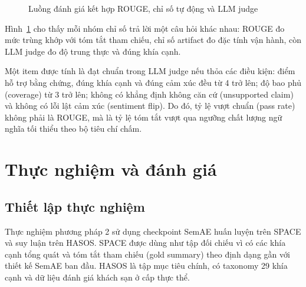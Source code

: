 \documentclass[12pt,a4paper]{report}
\begin{document}
\begin{figure}[tbp]
\centering
{}
\caption{Luồng đánh giá kết hợp ROUGE, chỉ số tự động và LLM judge}
\label{fig:evaluation-flow}
\end{figure}

Hình~\ref{fig:evaluation-flow} cho thấy mỗi nhóm chỉ số trả lời một câu hỏi khác nhau: ROUGE đo mức trùng khớp với tóm tắt tham chiếu, chỉ số artifact đo đặc tính vận hành, còn LLM judge đo độ trung thực và đúng khía cạnh.

Một item được tính là đạt chuẩn trong LLM judge nếu thỏa các điều kiện: điểm hỗ trợ bằng chứng, đúng khía cạnh và đúng cảm xúc đều từ 4 trở lên; độ bao phủ (coverage) từ 3 trở lên; không có khẳng định không căn cứ (unsupported claim) và không có lỗi lật cảm xúc (sentiment flip). Do đó, tỷ lệ vượt chuẩn (pass rate) không phải là ROUGE, mà là tỷ lệ tóm tắt vượt qua ngưỡng chất lượng ngữ nghĩa tối thiểu theo bộ tiêu chí chấm.

\chapter{Thực nghiệm và đánh giá}

\section{Thiết lập thực nghiệm}

Thực nghiệm phương pháp 2 sử dụng checkpoint SemAE huấn luyện trên SPACE và suy luận trên HASOS. SPACE được dùng như tập đối chiếu vì có các khía cạnh tổng quát và tóm tắt tham chiếu (gold summary) theo định dạng gần với thiết kế SemAE ban đầu. HASOS là tập mục tiêu chính, có taxonomy 29 khía cạnh và dữ liệu đánh giá khách sạn ở cấp thực thể.
\end{document}
